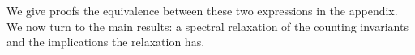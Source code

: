 \documentclass[10pt]{article}
\numberwithin{equation}{section}
\newcommand{\+}{%
	\raisebox{0.18ex}{\scaleobj{0.55}{+}}
}
\theoremstyle{definition}
\newcommand\numberthis{\addtocounter{equation}{1}\tag{\theequation}}
\begin{document}
\noindent We give proofs the equivalence between these two expressions in the appendix. We now turn to the main results: a spectral relaxation of the counting invariants and the implications the relaxation has. 

\end{document}
